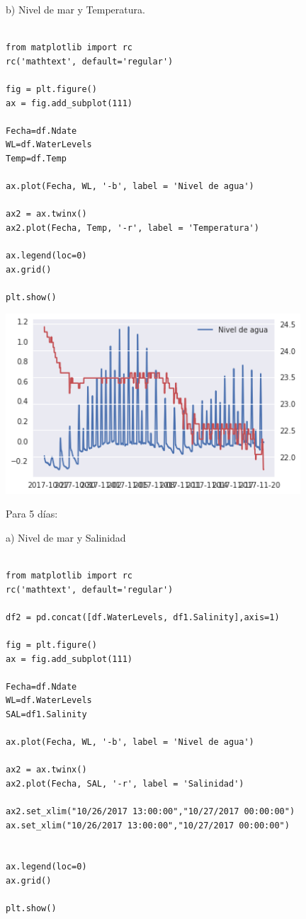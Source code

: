 \documentclass{article} %
\begin{document}
b) Nivel de mar y Temperatura.

\begin{verbatim} 

from matplotlib import rc
rc('mathtext', default='regular')

fig = plt.figure()
ax = fig.add_subplot(111)

Fecha=df.Ndate
WL=df.WaterLevels
Temp=df.Temp

ax.plot(Fecha, WL, '-b', label = 'Nivel de agua')

ax2 = ax.twinx()
ax2.plot(Fecha, Temp, '-r', label = 'Temperatura')

ax.legend(loc=0)
ax.grid()

plt.show()

\end{verbatim}


\begin{center}
 	\includegraphics[width=11cm]{sobre2.png}
\end{center}


Para 5 días:

a) Nivel de mar y Salinidad

\begin{verbatim} 

from matplotlib import rc
rc('mathtext', default='regular')

df2 = pd.concat([df.WaterLevels, df1.Salinity],axis=1)

fig = plt.figure()
ax = fig.add_subplot(111)

Fecha=df.Ndate
WL=df.WaterLevels
SAL=df1.Salinity

ax.plot(Fecha, WL, '-b', label = 'Nivel de agua')

ax2 = ax.twinx()
ax2.plot(Fecha, SAL, '-r', label = 'Salinidad')

ax2.set_xlim("10/26/2017 13:00:00","10/27/2017 00:00:00")
ax.set_xlim("10/26/2017 13:00:00","10/27/2017 00:00:00")


ax.legend(loc=0)
ax.grid()

plt.show()
\end{verbatim}
\end{document}

